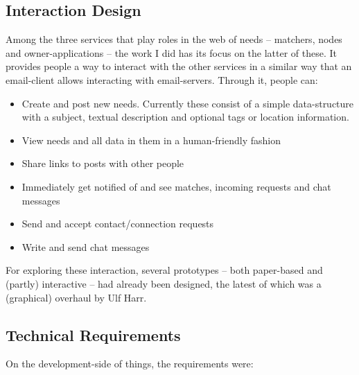 \subsection{Interaction Design}\label{interaction-design}

Among the three services that play roles in the web of needs --
matchers, nodes and owner-applications -- the work I did has its focus
on the latter of these. It provides people a way to interact with the
other services in a similar way that an email-client allows interacting
with email-servers. Through it, people can:

\begin{itemize}
\item
  Create and post new needs. Currently these consist of a simple
  data-structure with a subject, textual description and optional tags
  or location information.
\item
  View needs and all data in them in a human-friendly fashion
\item
  Share links to posts with other people
\item
  Immediately get notified of and see matches, incoming requests and
  chat messages
\item
  Send and accept contact/connection requests
\item
  Write and send chat messages
\end{itemize}

For exploring these interaction, several prototypes -- both paper-based
and (partly) interactive -- had already been designed, the latest of
which was a (graphical) overhaul by Ulf Harr.


\subsection{Technical Requirements}\label{technical-requirements}

On the development-side of things, the requirements were:

